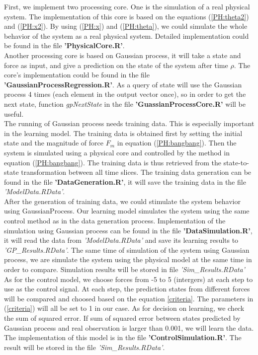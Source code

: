 \documentclass[11pt,twoside,a4paper]{article}
\begin{document}
First, we implement two processing core. One is the simulation of a
real physical system. The implementation of this core is based on the
equations (\ref{PH:theta2}) and (\ref{PH:x2}). By using (\ref{PH:x})
and (\ref{PH:theta}), we could simulate the whole behavior of the
system as a real physical system. Detailed implementation could be
found in the file \textbf{'PhysicalCore.R'}.\\

Another processing core is based on Gaussian process, it will take a
state and force as input, and give a prediction on the state of the
system after time $\rho$. The core's implementation could be found in
the file \textbf{'GaussianProcessRegression.R'}. As a query of state
will use the Gaussian process 4 times (each element in the output
vector once), so in order to get the next state, function
\textit{gpNextState} in the file \textbf{'GuassianProcessCore.R'}
will be useful.\\

The running of Gaussian process needs training data. This is especially
important in the learning model. The training data is obtained first
by setting the initial state and the magnitude of force $F_m$ in
equation (\ref{PH:bangbang}). Then the system is simulated using a
physical core and controlled by the method in equation
(\ref{PH:bangbang}). The training data is thus retrieved from the
state-to-state transformation between all time slices. The training
data generation can be found in the file
\textbf{'DataGeneration.R'}, it will save the training data in the
file \textit{'ModelData.RData'}.\\

After the generation of training data, we could stimulate the system
behavior using GaussianProcess. Our learning model simulates the
system using the same control method as in the data generation
process. Implementation of the simulation using Gaussian process can
be found in the file \textbf{'DataSimulation.R'}, it will read the
data from \textit{'ModelData.RData'} and save its learning results to
\textit{'GP\_Results.RData'}. The same time of simulation of the
system using Gaussian process, we are simulate the system using the
physical model at the same time in order to compare. Simulation
results will be stored in file \textit{'Sim\_Results.RData'}\\

As for the control model, we choose forces from -5 to 5 (intergers) at
each step to use as the control signal. At each step, the prediction states
from different forces will be compared and choosed based on the
equation \ref{criteria}. The parameters in (\ref{criteria}) will all be
set to 1 in our case. As for decision on learning, we check the sum of
squared error. If sum of squared error between states predicted by
Gaussian process and real observation is larger than 0.001, we will
learn the data. The implementation of this model is in the file
\textbf{'ControlSimulation.R'}. The result will be stored in the file \textit{'Sim\_Results.RData'}.\\
\end{document}
